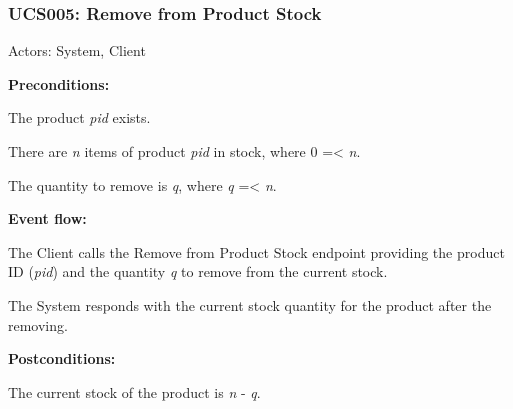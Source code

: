 \begin{ucbox}{\subsubsection{UCS005: Remove from Product Stock}}
\label{UCS005}

Actors: System, Client

\textbf{Preconditions:}

\ucitem The product \textit{pid} exists.

\ucitem There are \textit{n} items of product \textit{pid} in stock, where 0 =< \textit{n}.

\ucitem The quantity to remove is \textit{q}, where \textit{q} =< \textit{n}.

\textbf{Event flow:}

\ucitem The Client calls the Remove from Product Stock endpoint providing the product ID (\textit{pid}) and the quantity \textit{q} to remove from the current stock.

\ucitem The System responds with the current stock quantity for the product after the removing.

\textbf{Postconditions:}

\ucitem The current stock of the product is \textit{n} - \textit{q}.

\end{ucbox}
\newpage